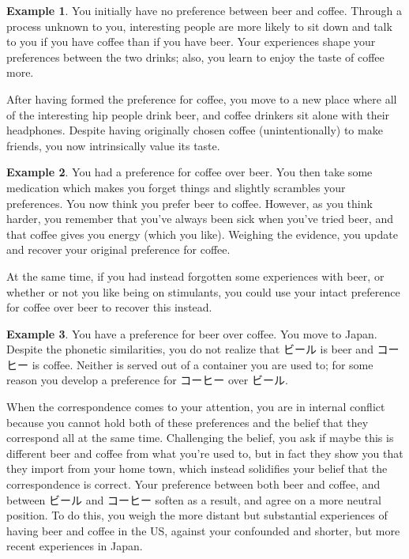 \documentclass{article}
\theoremstyle{plain}
\theoremstyle{definition}
\newtheorem{example}{Example}[section]
\theoremstyle{remark}
\begin{document}
	\begin{example}
		You initially have no preference between beer and coffee. Through a process unknown to you, interesting people are more likely to sit down and talk to you if you have coffee than if you have beer. Your experiences shape your preferences between the two drinks; also, you learn to enjoy the taste of coffee more.
		
		After having formed the preference for coffee, you move to a new place where all of the interesting hip people drink beer, and coffee drinkers sit alone with their headphones. Despite having originally chosen coffee (unintentionally) to make friends, you now intrinsically value its taste. 
	\end{example}

	\begin{example}
		You had a preference for coffee over beer. You then take some medication which makes you forget things and slightly scrambles your preferences. You now think you prefer beer to coffee. However, as you think harder, you remember that you've always been sick when you've tried beer, and that coffee gives you energy (which you like). Weighing the evidence, you  update and recover your original preference for coffee.
		
		At the same time, if you had instead forgotten some experiences with beer, or whether or not you like being on stimulants, you could use your intact preference for coffee over beer to recover this instead.
	\end{example}

	\begin{example}
		You have a preference for beer over coffee. You move to Japan. Despite the phonetic similarities, you do not realize that ビール is beer and コーヒー is coffee. Neither is served out of a container you are used to; for some reason you develop a preference for コーヒー over ビール. 
		
		When the correspondence comes to your attention, you are in internal conflict because you cannot hold both of these preferences and the belief that they correspond all at the same time. Challenging the belief, you ask if maybe this is different beer and coffee from what you're used to, but in fact they show you that they import from your home town, which instead solidifies your belief that the correspondence is correct. Your preference between both beer and coffee, and between ビール and コーヒー soften as a result, and agree on a more neutral position. To do this, you weigh the more distant but substantial experiences of having beer and coffee in the US, against your confounded and shorter, but more recent experiences in Japan.
	\end{example}
\end{document}
